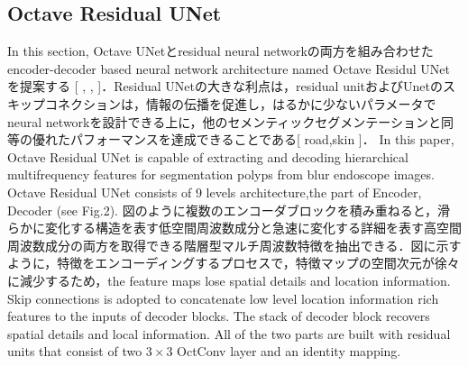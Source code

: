 \documentclass{article}
\begin{document}
\subsection{Octave Residual UNet}
In this section, Octave UNetとresidual neural networkの両方を組み合わせたencoder-decoder based neural network architecture named Octave Residul UNetを提案する [ , , ]．Residual UNetの大きな利点は，residual unitおよびUnetのスキップコネクションは，情報の伝播を促進し，はるかに少ないパラメータでneural networkを設計できる上に，他のセメンティックセグメンテーションと同等の優れたパフォーマンスを達成できることである[ road,skin ]．
In this paper, Octave Residual UNet is capable of extracting and decoding hierarchical multifrequency features for  segmentation polyps from blur endoscope images. Octave Residual UNet consists of 9 levels architecture,the part of Encoder, Decoder (see Fig.2).
図のように複数のエンコーダブロックを積み重ねると，滑らかに変化する構造を表す低空間周波数成分と急速に変化する詳細を表す高空間周波数成分の両方を取得できる階層型マルチ周波数特徴を抽出できる．図に示すように，特徴をエンコーディングするプロセスで，特徴マップの空間次元が徐々に減少するため，the feature maps lose spatial details and location information. Skip connections  is adopted to concatenate low level location information rich features to the inputs of decoder blocks. The stack of decoder block recovers spatial details and local information. All of the two parts are built with residual units that consist of two $3\times3$ OctConv layer and an identity mapping.




\end{document}
